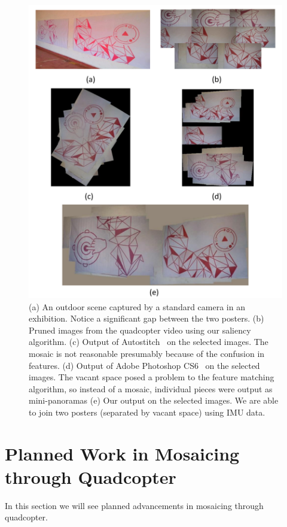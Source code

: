 \documentclass[11pt]{article}
\begin{document}
\begin{figure}[h!]
\centering
\includegraphics[width=0.85\linewidth]{mosaicing/results/Purple_red}
\caption{(a) An outdoor scene captured by a standard camera in an
  exhibition. Notice a significant gap between the two posters.  (b) Pruned
  images from the quadcopter video using our saliency algorithm. (c) Output of
  Autostitch~\cite{autostitch} on the selected images. The mosaic is not
  reasonable presumably because of the confusion in features. (d) Output of Adobe
  Photoshop CS6~\cite{photoshop} on the selected images. The vacant space posed a
  problem to the feature matching algorithm, so instead of a mosaic,
  individual pieces were output as mini-panoramas (e) Our output on
  the selected images. We are able to join two posters (separated by
  vacant space) using IMU data.}
\label{fig:results2}
\end{figure}

\section{Planned Work in Mosaicing through Quadcopter}
In this section we will see planned advancements in mosaicing through
quadcopter.
\end{document}
